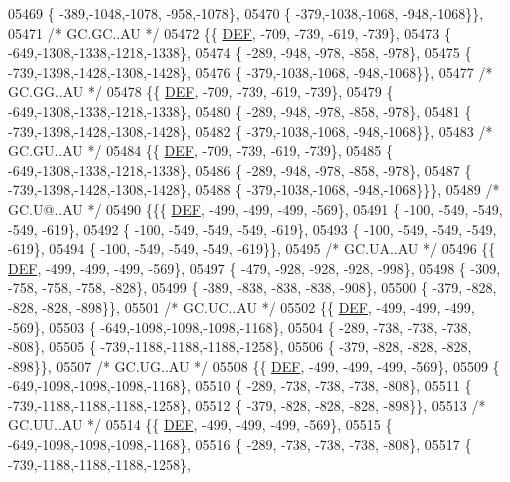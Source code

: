 \begin{DoxyCode}
05469 \{ -389,-1048,-1078, -958,-1078\},
05470 \{ -379,-1038,-1068, -948,-1068\}\},
05471 \textcolor{comment}{/* GC.GC..AU */}
05472 \{\{  \mbox{\hyperlink{1_88_84__epars_8h_a397419fc12b37ed479c8abb9d444d843}{DEF}}, -709, -739, -619, -739\},
05473 \{ -649,-1308,-1338,-1218,-1338\},
05474 \{ -289, -948, -978, -858, -978\},
05475 \{ -739,-1398,-1428,-1308,-1428\},
05476 \{ -379,-1038,-1068, -948,-1068\}\},
05477 \textcolor{comment}{/* GC.GG..AU */}
05478 \{\{  \mbox{\hyperlink{1_88_84__epars_8h_a397419fc12b37ed479c8abb9d444d843}{DEF}}, -709, -739, -619, -739\},
05479 \{ -649,-1308,-1338,-1218,-1338\},
05480 \{ -289, -948, -978, -858, -978\},
05481 \{ -739,-1398,-1428,-1308,-1428\},
05482 \{ -379,-1038,-1068, -948,-1068\}\},
05483 \textcolor{comment}{/* GC.GU..AU */}
05484 \{\{  \mbox{\hyperlink{1_88_84__epars_8h_a397419fc12b37ed479c8abb9d444d843}{DEF}}, -709, -739, -619, -739\},
05485 \{ -649,-1308,-1338,-1218,-1338\},
05486 \{ -289, -948, -978, -858, -978\},
05487 \{ -739,-1398,-1428,-1308,-1428\},
05488 \{ -379,-1038,-1068, -948,-1068\}\}\},
05489 \textcolor{comment}{/* GC.U@..AU */}
05490 \{\{\{  \mbox{\hyperlink{1_88_84__epars_8h_a397419fc12b37ed479c8abb9d444d843}{DEF}}, -499, -499, -499, -569\},
05491 \{ -100, -549, -549, -549, -619\},
05492 \{ -100, -549, -549, -549, -619\},
05493 \{ -100, -549, -549, -549, -619\},
05494 \{ -100, -549, -549, -549, -619\}\},
05495 \textcolor{comment}{/* GC.UA..AU */}
05496 \{\{  \mbox{\hyperlink{1_88_84__epars_8h_a397419fc12b37ed479c8abb9d444d843}{DEF}}, -499, -499, -499, -569\},
05497 \{ -479, -928, -928, -928, -998\},
05498 \{ -309, -758, -758, -758, -828\},
05499 \{ -389, -838, -838, -838, -908\},
05500 \{ -379, -828, -828, -828, -898\}\},
05501 \textcolor{comment}{/* GC.UC..AU */}
05502 \{\{  \mbox{\hyperlink{1_88_84__epars_8h_a397419fc12b37ed479c8abb9d444d843}{DEF}}, -499, -499, -499, -569\},
05503 \{ -649,-1098,-1098,-1098,-1168\},
05504 \{ -289, -738, -738, -738, -808\},
05505 \{ -739,-1188,-1188,-1188,-1258\},
05506 \{ -379, -828, -828, -828, -898\}\},
05507 \textcolor{comment}{/* GC.UG..AU */}
05508 \{\{  \mbox{\hyperlink{1_88_84__epars_8h_a397419fc12b37ed479c8abb9d444d843}{DEF}}, -499, -499, -499, -569\},
05509 \{ -649,-1098,-1098,-1098,-1168\},
05510 \{ -289, -738, -738, -738, -808\},
05511 \{ -739,-1188,-1188,-1188,-1258\},
05512 \{ -379, -828, -828, -828, -898\}\},
05513 \textcolor{comment}{/* GC.UU..AU */}
05514 \{\{  \mbox{\hyperlink{1_88_84__epars_8h_a397419fc12b37ed479c8abb9d444d843}{DEF}}, -499, -499, -499, -569\},
05515 \{ -649,-1098,-1098,-1098,-1168\},
05516 \{ -289, -738, -738, -738, -808\},
05517 \{ -739,-1188,-1188,-1188,-1258\},

\end{DoxyCode}
